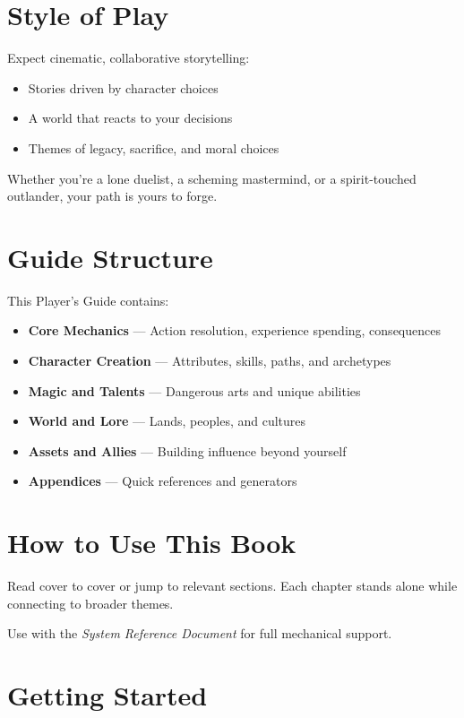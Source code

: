 \begin{multicols}{2}
\section*{Style of Play} 

Expect cinematic, collaborative storytelling: \begin{itemize} \item Stories driven by character choices \item A world that reacts to your decisions \item Themes of legacy, sacrifice, and moral choices \end{itemize}

Whether you're a lone duelist, a scheming mastermind, or a spirit-touched outlander, your path is yours to forge.

\section*{Guide Structure}

This Player's Guide contains:

\begin{itemize} 
  \item \textbf{Core Mechanics} — Action resolution, experience spending, consequences 
  \item \textbf{Character Creation} — Attributes, skills, paths, and archetypes 
  \item \textbf{Magic and Talents} — Dangerous arts and unique abilities 
  \item \textbf{World and Lore} — Lands, peoples, and cultures 
  \item \textbf{Assets and Allies} — Building influence beyond yourself 
  \item \textbf{Appendices} — Quick references and generators 
\end{itemize}

\section*{How to Use This Book}

Read cover to cover or jump to relevant sections. Each chapter stands alone while connecting to broader themes.

Use with the \emph{System Reference Document} for full mechanical support.

\section*{Getting Started}


\end{multicols}
